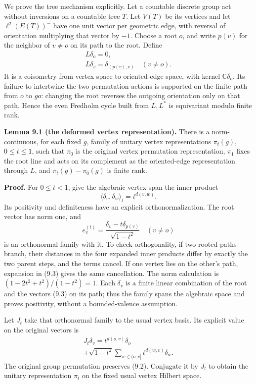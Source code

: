\documentclass[
  11pt,
]{article}
\begin{document}
We prove the tree mechanism explicitly. Let a countable discrete group
act without inversions on a countable tree \(T\). Let \(V(T)\) be its
vertices and let \(\ell^2(E(T))^-\) have one unit vector per geometric
edge, with reversal of orientation multiplying that vector by \(-1\).
Choose a root \(o\), and write \(p(v)\) for the neighbor of \(v\ne o\)
on its path to the root. Define \[
\begin{gathered}
L\delta_o=0,\\
L\delta_v=\delta_{(p(v),v)}\quad(v\ne o).
\end{gathered}
\tag{9.1}
\] It is a coisometry from vertex space to oriented-edge space, with
kernel \(\mathbb C\delta_o\). Its failure to intertwine the two
permutation actions is supported on the finite path from \(o\) to
\(go\): changing the root reverses the outgoing orientation only on that
path. Hence the even Fredholm cycle built from \(L,L^*\) is equivariant
modulo finite rank.

\textbf{Lemma 9.1 (the deformed vertex representation).} There is a
norm-continuous, for each fixed \(g\), family of unitary vertex
representations \(\pi_t(g)\), \(0\leq t\leq1\), such that \(\pi_0\) is
the original vertex permutation representation, \(\pi_1\) fixes the root
line and acts on its complement as the oriented-edge representation
through \(L\), and \(\pi_t(g)-\pi_0(g)\) is finite rank.

\textbf{Proof.} For \(0\leq t<1\), give the algebraic vertex span the
inner product \[
\langle\delta_v,\delta_w\rangle_t=t^{d(v,w)}.
\tag{9.2}
\] Its positivity and definiteness have an explicit orthonormalization.
The root vector has norm one, and \[
e_v^{(t)}=
 \frac{\delta_v-t\delta_{p(v)}}{\sqrt{1-t^2}}
 \quad(v\ne o)
\tag{9.3}
\] is an orthonormal family with it. To check orthogonality, if two
rooted paths branch, their distances in the four expanded inner products
differ by exactly the two parent steps, and the terms cancel. If one
vertex lies on the other's path, expansion in (9.3) gives the same
cancellation. The norm calculation is \((1-2t^2+t^2)/(1-t^2)=1\). Each
\(\delta_v\) is a finite linear combination of the root and the vectors
(9.3) on its path; thus the family spans the algebraic space and proves
positivity, without a bounded-valence assumption.

Let \(J_t\) take that orthonormal family to the usual vertex basis. Its
explicit value on the original vectors is \[
\begin{gathered}
J_t\delta_v=t^{d(o,v)}\delta_o\\
 +\sqrt{1-t^2}
   \sum_{w\in(o,v]}t^{d(w,v)}\delta_w.
\end{gathered}
\tag{9.4}
\] The original group permutation preserves (9.2). Conjugate it by
\(J_t\) to obtain the unitary representation \(\pi_t\) on the fixed
usual vertex Hilbert space.
\end{document}
